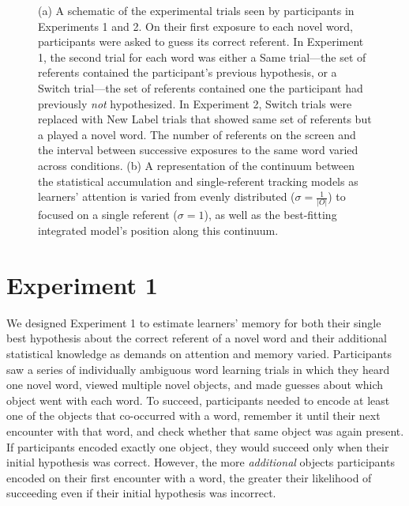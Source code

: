 \documentclass{pnastwo}
\begin{document}
\begin{article}
 \begin{figure}[t]
	\caption{\label{fig:design} (a)  A schematic of the experimental trials seen by participants in Experiments 1 and 2. On their first exposure to each novel word, participants were asked to guess its correct referent. In Experiment 1, the second trial for each word was either a Same trial---the set of referents contained the participant's previous hypothesis, or a Switch trial---the set of referents contained one the participant had previously \emph{not} hypothesized. In Experiment 2, Switch trials were replaced with New Label trials that showed same set of referents but a played a novel word. The number of referents on the screen and the interval between successive exposures to the same word varied across conditions. (b) A representation of the continuum between the statistical accumulation and single-referent tracking models as learners' attention is varied from evenly distributed ($\sigma=\frac{1}{|O|}$) to focused on a single referent ($\sigma=1$), as well as the best-fitting integrated model's position along this continuum.}
\end{figure}

\section{Experiment 1}

We designed Experiment 1 to estimate learners' memory for both their single best hypothesis about the correct referent of a novel word and their additional statistical knowledge as demands on attention and memory varied. Participants saw a series of individually ambiguous word learning trials in which they heard one novel word, viewed multiple novel objects, and made guesses about which object went with each word. To succeed, participants needed to encode at least one of the objects that co-occurred with a word, remember it until their next encounter with that word, and check whether that same object was again present. If participants encoded exactly one object, they would succeed only when their initial hypothesis was correct. However, the more \emph{additional} objects participants encoded on their first encounter with a word, the greater their likelihood of succeeding even if their initial hypothesis was incorrect. 


\end{article}
\end{document}
